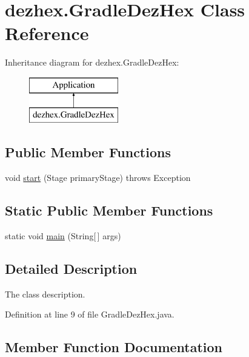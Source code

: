 \hypertarget{classdezhex_1_1_gradle_dez_hex}{}\section{dezhex.\+Gradle\+Dez\+Hex Class Reference}
\label{classdezhex_1_1_gradle_dez_hex}
Inheritance diagram for dezhex.\+Gradle\+Dez\+Hex\+:\begin{figure}[H]
\begin{center}
\leavevmode
\includegraphics[height=2.000000cm]{classdezhex_1_1_gradle_dez_hex}
\end{center}
\end{figure}
\subsection*{Public Member Functions}
\begin{DoxyCompactItemize}
\item 
void \hyperlink{classdezhex_1_1_gradle_dez_hex_ae0b72fc8103dca55356650ac085d2c7e}{start} (Stage primary\+Stage)  throws Exception 
\end{DoxyCompactItemize}
\subsection*{Static Public Member Functions}
\begin{DoxyCompactItemize}
\item 
static void \hyperlink{classdezhex_1_1_gradle_dez_hex_a5b39f02998d799114ecb4675f64c5453}{main} (String\mbox{[}$\,$\mbox{]} args)
\end{DoxyCompactItemize}


\subsection{Detailed Description}
The class description. 

Definition at line 9 of file Gradle\+Dez\+Hex.\+java.



\subsection{Member Function Documentation}
\mbox{\label{classdezhex_1_1_gradle_dez_hex_a5b39f02998d799114ecb4675f64c5453}} 
